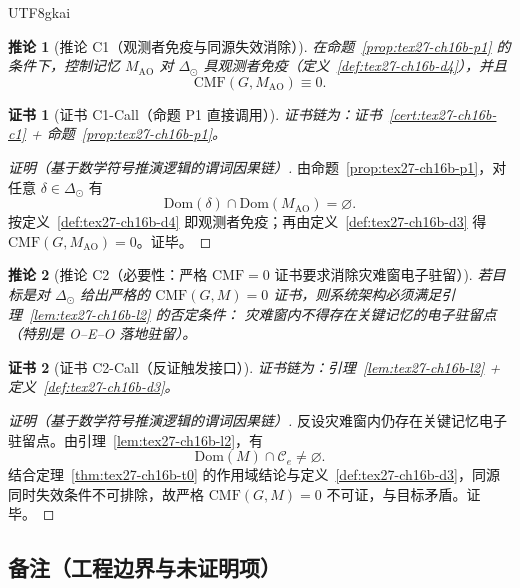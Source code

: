 \documentclass[12pt]{article}
\newtheorem{corollary}{推论}[section]
\newtheorem{Certificate}{证书}[section]
\begin{document}
\begin{CJK*}{UTF8}{gkai}
\begin{corollary}[推论 C1（观测者免疫与同源失效消除）]
\label{cor:tex27-ch16b-c1}
在命题~\ref{prop:tex27-ch16b-p1} 的条件下，控制记忆 $M_{\mathrm{AO}}$ 对 $\Delta_{\odot}$ 具观测者免疫（定义~\ref{def:tex27-ch16b-d4}），并且
\[
  \mathrm{CMF}(G,M_{\mathrm{AO}})\equiv 0.
\]
\end{corollary}

\begin{Certificate}[证书 C1-Call（命题 P1 直接调用）]
\label{cert:tex27-ch16b-c1call}
证书链为：证书~\ref{cert:tex27-ch16b-c1} + 命题~\ref{prop:tex27-ch16b-p1}。
\end{Certificate}

\begin{proof}[证明（基于数学符号推演逻辑的谓词因果链）]
由命题~\ref{prop:tex27-ch16b-p1}，对任意 $\delta\in\Delta_{\odot}$ 有
\[
  \mathrm{Dom}(\delta)\cap\mathrm{Dom}(M_{\mathrm{AO}})=\varnothing.
\]
按定义~\ref{def:tex27-ch16b-d4} 即观测者免疫；再由定义~\ref{def:tex27-ch16b-d3} 得 $\mathrm{CMF}(G,M_{\mathrm{AO}})=0$。证毕。
\end{proof}

\begin{corollary}[推论 C2（必要性：严格 \texorpdfstring{$\mathrm{CMF}=0$}{CMF=0} 证书要求消除灾难窗电子驻留）]
\label{cor:tex27-ch16b-c2}
若目标是对 $\Delta_{\odot}$ 给出严格的 $\mathrm{CMF}(G,M)=0$ 证书，则系统架构必须满足引理~\ref{lem:tex27-ch16b-l2} 的否定条件：
灾难窗内不得存在关键记忆的电子驻留点（特别是 O--E--O 落地驻留）。
\end{corollary}

\begin{Certificate}[证书 C2-Call（反证触发接口）]
\label{cert:tex27-ch16b-c2call}
证书链为：引理~\ref{lem:tex27-ch16b-l2} + 定义~\ref{def:tex27-ch16b-d3}。
\end{Certificate}

\begin{proof}[证明（基于数学符号推演逻辑的谓词因果链）]
反设灾难窗内仍存在关键记忆电子驻留点。由引理~\ref{lem:tex27-ch16b-l2}，有
\[
  \mathrm{Dom}(M)\cap\mathcal{C}_{e}\neq\varnothing.
\]
结合定理~\ref{thm:tex27-ch16b-t0} 的作用域结论与定义~\ref{def:tex27-ch16b-d3}，同源同时失效条件不可排除，故严格 $\mathrm{CMF}(G,M)=0$ 不可证，与目标矛盾。证毕。
\end{proof}

\subsection{备注（工程边界与未证明项）}
\label{subsec:tex27-ch16b-remarks}


\end{CJK*}
\end{document}
